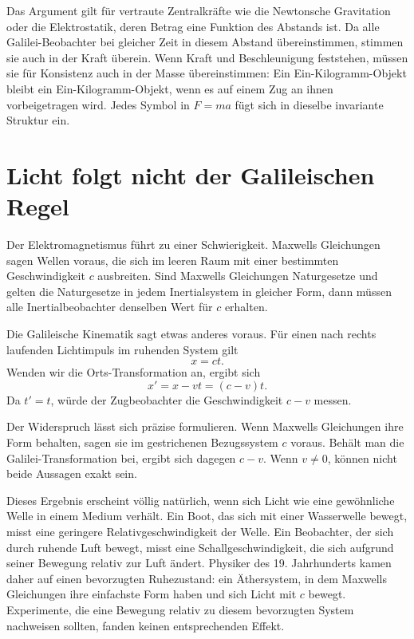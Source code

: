 Das Argument gilt für vertraute Zentralkräfte wie die Newtonsche Gravitation oder die Elektrostatik, deren Betrag eine Funktion des Abstands ist. Da alle Galilei-Beobachter bei gleicher Zeit in diesem Abstand übereinstimmen, stimmen sie auch in der Kraft überein. Wenn Kraft und Beschleunigung feststehen, müssen sie für Konsistenz auch in der Masse übereinstimmen: Ein Ein-Kilogramm-Objekt bleibt ein Ein-Kilogramm-Objekt, wenn es auf einem Zug an ihnen vorbeigetragen wird. Jedes Symbol in \(F=ma\) fügt sich in dieselbe invariante Struktur ein.

\section{Licht folgt nicht der Galileischen Regel}

Der Elektromagnetismus führt zu einer Schwierigkeit. Maxwells Gleichungen sagen Wellen voraus, die sich im leeren Raum mit einer bestimmten Geschwindigkeit \(c\) ausbreiten. Sind Maxwells Gleichungen Naturgesetze und gelten die Naturgesetze in jedem Inertialsystem in gleicher Form, dann müssen alle Inertialbeobachter denselben Wert für \(c\) erhalten.

Die Galileische Kinematik sagt etwas anderes voraus. Für einen nach rechts laufenden Lichtimpuls im ruhenden System gilt
\begin{equation}
x=ct.
\end{equation}
Wenden wir die Orts-Transformation an, ergibt sich
\begin{equation}
x'=x-vt=(c-v)t.
\end{equation}
Da \(t'=t\), würde der Zugbeobachter die Geschwindigkeit \(c-v\) messen.

Der Widerspruch lässt sich präzise formulieren. Wenn Maxwells Gleichungen ihre Form behalten, sagen sie im gestrichenen Bezugssystem \(c\) voraus. Behält man die Galilei-Transformation bei, ergibt sich dagegen \(c-v\). Wenn \(v\ne0\), können nicht beide Aussagen exakt sein.

Dieses Ergebnis erscheint völlig natürlich, wenn sich Licht wie eine gewöhnliche Welle in einem Medium verhält. Ein Boot, das sich mit einer Wasserwelle bewegt, misst eine geringere Relativgeschwindigkeit der Welle. Ein Beobachter, der sich durch ruhende Luft bewegt, misst eine Schallgeschwindigkeit, die sich aufgrund seiner Bewegung relativ zur Luft ändert. Physiker des 19. Jahrhunderts kamen daher auf einen bevorzugten Ruhezustand: ein Äthersystem, in dem Maxwells Gleichungen ihre einfachste Form haben und sich Licht mit \(c\) bewegt. Experimente, die eine Bewegung relativ zu diesem bevorzugten System nachweisen sollten, fanden keinen entsprechenden Effekt.


